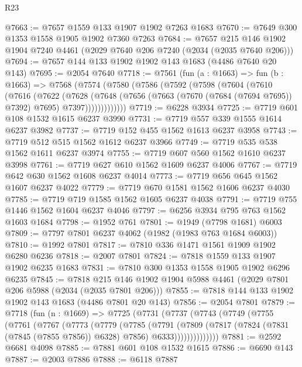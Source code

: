 \begin{lexlean}{R23}
\begin{coremodule}
@7663 := @7657 @1559 @133 @1907 @1902 @7263 @1683
@7670 := @7649 @300 @1353 @1558 @1905 @1902 @7360 @7263
@7684 := @7657 @215 @146 @1902 @1904 @7240 @4461 (@2029 @7640 @206 @7240 (@2034 (@2035 @7640 @206)))
@7694 := @7657 @144 @133 @1902 @1902 @143 @1683 (@4486 @7640 @20 @143)
@7695 := @2054 @7640
@7718 := @7561
    (fun (a : @1663) =>
    fun (b : @1663) =>
    @7568
      (@7574
        (@7580
          (@7586
            (@7592
              (@7598
                (@7604
                  (@7610
                    (@7616
                      (@7622
                        (@7628
                          (@7648
                            (@7656
                              (@7663 (@7670 (@7684 (@7694 @7695)) @7392) @7695)
                              @7397)))))))))))))
@7719 := @6228 @3934
@7725 := @7719 @601 @108 @1532 @1615 @6237 @3990
@7731 := @7719 @557 @339 @1555 @1614 @6237 @3982
@7737 := @7719 @152 @455 @1562 @1613 @6237 @3958
@7743 := @7719 @512 @515 @1562 @1612 @6237 @3966
@7749 := @7719 @535 @538 @1562 @1611 @6237 @3974
@7755 := @7719 @607 @560 @1562 @1610 @6237 @3998
@7761 := @7719 @627 @610 @1562 @1609 @6237 @4006
@7767 := @7719 @642 @630 @1562 @1608 @6237 @4014
@7773 := @7719 @656 @645 @1562 @1607 @6237 @4022
@7779 := @7719 @670 @1581 @1562 @1606 @6237 @4030
@7785 := @7719 @719 @1585 @1562 @1605 @6237 @4038
@7791 := @7719 @755 @1446 @1562 @1604 @6237 @4046
@7797 := @6256 @3934 @795 @763 @1562 @1603 @1684
@7798 := @1952 @761
@7801 := @1949 (@7798 @1681) @6003
@7809 := @7797 @7801 @6237 @4062 (@1982 (@1983 @763 @1684 @6003))
@7810 := @1992 @7801
@7817 := @7810 @336 @1471 @1561 @1909 @1902 @6280 @6236
@7818 := @2007 @7801
@7824 := @7818 @1559 @133 @1907 @1902 @6235 @1683
@7831 := @7810 @300 @1353 @1558 @1905 @1902 @6296 @6235
@7845 := @7818 @215 @146 @1902 @1904 @5988 @4461 (@2029 @7801 @206 @5988 (@2034 (@2035 @7801 @206)))
@7855 := @7818 @144 @133 @1902 @1902 @143 @1683 (@4486 @7801 @20 @143)
@7856 := @2054 @7801
@7879 := @7718
    (fun (n : @1669) =>
    @7725
      (@7731
        (@7737
          (@7743
            (@7749
              (@7755
                (@7761
                  (@7767
                    (@7773
                      (@7779
                        (@7785
                          (@7791
                            (@7809
                              (@7817
                                (@7824 (@7831 (@7845 (@7855 @7856)) @6328) @7856)
                                @6333))))))))))))))
@7881 := @2592 @6681 @4098
@7885 := @7881 @601 @108 @1532 @1615
@7886 := @6690 @143
@7887 := @2003 @7886
@7888 := @6118 @7887

\end{coremodule}
\end{lexlean}
